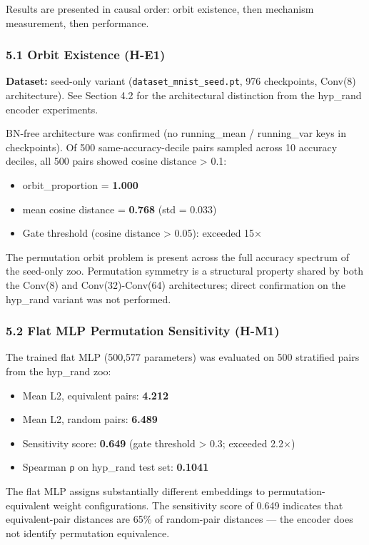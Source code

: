 
Results are presented in causal order: orbit existence, then mechanism measurement, then performance.

\subsubsection{5.1 Orbit Existence (H-E1)}

\textbf{Dataset:} seed-only variant (\texttt{dataset_mnist_seed.pt}, 976 checkpoints, Conv(8) architecture). See Section 4.2 for the architectural distinction from the hyp_rand encoder experiments.

BN-free architecture was confirmed (no running_mean / running_var keys in checkpoints). Of 500 same-accuracy-decile pairs sampled across 10 accuracy deciles, all 500 pairs showed cosine distance > 0.1:

\begin{itemize}
\item orbit_proportion = \textbf{1.000}
\item mean cosine distance = \textbf{0.768} (std = 0.033)
\item Gate threshold (cosine distance > 0.05): exceeded 15×
\end{itemize}

The permutation orbit problem is present across the full accuracy spectrum of the seed-only zoo. Permutation symmetry is a structural property shared by both the Conv(8) and Conv(32)-Conv(64) architectures; direct confirmation on the hyp_rand variant was not performed.

\subsubsection{5.2 Flat MLP Permutation Sensitivity (H-M1)}

The trained flat MLP (500,577 parameters) was evaluated on 500 stratified pairs from the hyp_rand zoo:

\begin{itemize}
\item Mean L2, equivalent pairs: \textbf{4.212}
\item Mean L2, random pairs: \textbf{6.489}
\item Sensitivity score: \textbf{0.649} (gate threshold > 0.3; exceeded 2.2×)
\item Spearman ρ on hyp_rand test set: \textbf{0.1041}
\end{itemize}

The flat MLP assigns substantially different embeddings to permutation-equivalent weight configurations. The sensitivity score of 0.649 indicates that equivalent-pair distances are 65\% of random-pair distances — the encoder does not identify permutation equivalence.

